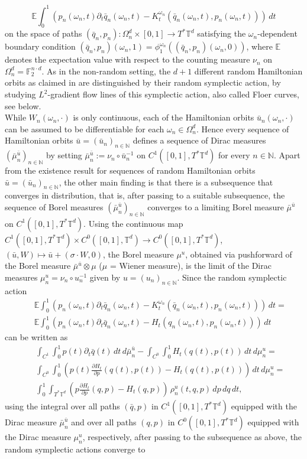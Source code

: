 \documentclass[a4paper,11pt]{amsart}
\newcommand{\NN}{\mathbb{N}}
\newcommand{\TT}{\mathbb{T}}
\newcommand{\FF}{\mathbb{F}}
\newcommand{\EE}{\mathbb{E}}
\begin{document}
\[\EE\int_0^1 \left(p_n(\omega_n,t)\partial_t\bar{q}_n(\omega_n,t)-K^{\omega_n}_t(\bar{q}_n(\omega_n,t),p_n(\omega_n,t))\right)\,dt \] on the space of paths $(\bar{q}_n,p_n):\Omega_n^d\times [0,1]\to T^*\TT^d$ satisfying the $\omega_n$-dependent boundary condition $(\bar{q}_n,p_n)(\omega_n,1)=\phi^{\omega_n}_1((\bar{q}_n,p_n)(\omega_n,0))$, 
where $\EE$ denotes the expectation value with respect to the counting measure $\nu_n$ on $\Omega_n^d=\FF_2^{n\cdot d}$. As in the non-random setting, the $d+1$ different random Hamiltonian orbits as claimed in  are distinguished by their random symplectic action, by studying $L^2$-gradient flow lines of this symplectic action, also called Floer curves, see below.\\
\indent While $W_n(\omega_n,\cdot)$ is only continuous, each of the Hamiltonian orbits $\bar{u}_n(\omega_n,\cdot)$ can be assumed to be differentiable for each $\omega_n\in\Omega_n^d$. Hence every sequence of Hamiltonian orbits $\bar{u}=(\bar{u}_n)_{n\in\NN}$ defines a sequence of Dirac measures $(\bar{\mu}_n^{\bar{u}})_{n\in\NN}$ by setting $\bar{\mu}_n^{\bar{u}}:=\nu_n\circ \bar{u}_n^{-1}$ on $C^1([0,1],T^*\TT^d)$ for every $n\in\NN$. Apart from the existence result for sequences of random Hamiltonian orbits $\bar{u}=(\bar{u}_n)_{n\in\NN}$, the other main finding is that there is a subsequence that converges in distribution, that is, after passing to a suitable subsequence, the sequence of Borel measures $(\bar{\mu}_n^{\bar{u}})_{n\in\NN}$ converges to a limiting Borel measure $\bar{\mu}^{\bar{u}}$ on $C^1([0,1],T^*\TT^d)$. Using the continuous map $C^1([0,1],T^*\TT^d)\times C^0([0,1],\TT^d)\to C^0([0,1],T^*\TT^d)$, $(\bar{u},W)\mapsto \bar{u}+(\sigma\cdot W,0)$, the Borel measure $\mu^u$, obtained via pushforward of the Borel measure $\bar{\mu}^{\bar{u}}\otimes\mu$ ($\mu$ = Wiener measure), is the limit of the Dirac measures $\mu_n^u=\nu_n\circ u_n^{-1}$ given by $u=(u_n)_{n\in\NN}$. Since the random symplectic action 
\begin{eqnarray*} &&\EE\int_0^1 \left(p_n(\omega_n,t)\partial_t\bar{q}_n(\omega_n,t)-K^{\omega_n}_t(\bar{q}_n(\omega_n,t),p_n(\omega_n,t))\right)\,dt =\\&&\EE\int_0^1 \left(p_n(\omega_n,t)\partial_t\bar{q}_n(\omega_n,t)-H_t(q_n(\omega_n,t),p_n(\omega_n,t))\right)\,dt\end{eqnarray*} 
can be written as 
\begin{eqnarray*}
&&\int_{C^1}\int_0^1 p(t)\partial_t\bar{q}(t)\,dt\,d\bar{\mu}_n^{\bar{u}} - \int_{C^0} \int_0^1 H_t(q(t),p(t))\,dt\,d\mu_n^u =\\
&&\int_{C^0}\int_0^1 \left(p(t)\frac{\partial H_t}{\partial p}(q(t),p(t))- H_t(q(t),p(t))\right)\,dt\,d\mu_n^u =\\
&&\int_0^1\int_{T^*\TT^d} \left(p\frac{\partial H_t}{\partial p}(q,p)- H_t(q,p)\right)\,\rho^u_n(t,q,p) \,dp\,dq \,dt,
\end{eqnarray*} using the integral over all paths $(\bar{q},p)$ in $C^1([0,1],T^*\TT^d)$ equipped with the Dirac measure $\bar{\mu}^{\bar{u}}_n$ and over all paths $(q,p)$ in $C^0([0,1],T^*\TT^d)$ equipped with the Dirac measure $\mu^u_n$, respectively, after passing to the subsequence as above, the random symplectic actions converge to \
\end{document}
